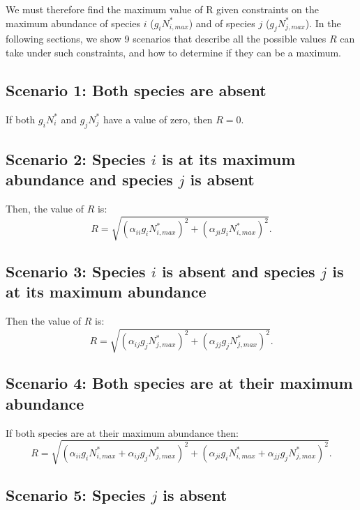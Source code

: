 \begin{refsection}
We must therefore find the maximum value of R given constraints on the maximum abundance of species $i$ ($g_{i}N_{i,max}^{*}$) and of species $j$ ($g_{j}N_{j,max}^{*}$). In the following sections, we show 9 scenarios that describe all the possible values $R$ can take under such constraints, and how to determine if they can be a maximum.

\subsection*{Scenario 1: Both species are absent}

If both $g_{i}N_{i}^{*}$ and $g_{j}N_{j}^{*}$ have a value of zero, then $R = 0$.

\subsection*{Scenario 2: Species $i$ is at its maximum abundance and species $j$ is absent}

Then, the value of $R$ is:
\begin{equation}
R = \sqrt{ (\alpha_{ii}g_{i}N_{i,max}^{*})^{2} + (\alpha_{ji}g_{i}N_{i,max}^{*})^{2} }.
\label{scenario2}
\end{equation}

\subsection*{Scenario 3: Species $i$ is absent and species $j$ is at its maximum abundance}

Then the value of $R$ is:
\begin{equation}
R = \sqrt{ (\alpha_{ij}g_{j}N_{j,max}^{*})^{2} + (\alpha_{jj}g_{j}N_{j,max}^{*})^{2} }.
\label{scenario3}
\end{equation}


\subsection*{Scenario 4: Both species are at their maximum abundance}
If both species are at their maximum abundance then:
\begin{equation}
\label{scenario4}
R = \sqrt{ (\alpha_{ii}g_{i}N_{i,max}^{*} +\alpha_{ij}g_{j}N_{j,max}^{*})^{2} + ( \alpha_{ji}g_{i}N_{i,max}^{*}+ \alpha_{jj}g_{j}N_{j,max}^{*})^{2} }.
\end{equation}

\subsection*{Scenario 5: Species $j$ is absent }


\end{refsection}
